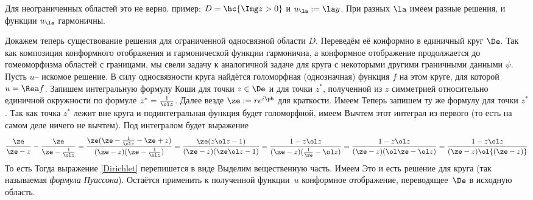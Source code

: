 \documentclass[a4paper]{article}
\begin{document}
Для неограниченных областей это не верно. пример: $D = \hc{\Img  z > 0}$ и $u_\la :=\la y$. При разных
$\la$ имеем разные решения, и функции $u_\la$ гармоничны.

Докажем теперь существование решения для ограниченной односвязной области $D$.
Переведём её конформно в единичный круг $\De$. Так как композиция конформного отображения и гармонической
функции гармонична, а конформное отображение продолжается до гомеоморфизма областей с границами, мы свели
задачу к аналогичной задаче для круга с некоторыми другими граничными данными $\psi$. Пусть $u$--
искомое решение. В силу односвязности круга найдётся голоморфная (однозначная) функция $f$ на этом круге,
для которой $u=\Rea f$. Запишем интегральную формулу Коши для точки $z\in \De$ и для точки $z^*$,
полученной из $z$ симметрией относительно единичной окружности по формуле $z^* = \frac{1}{\ol z}$.
Далее везде $\ze := re^{i\ph}$ для краткости. Имеем
Теперь запишем ту же формулу для точки $z^*$. Так как точка $z^*$ лежит вне круга и подинтегральная
функция будет голоморфной, имеем
Вычтем этот интеграл из первого (то есть на самом деле ничего не вычтем). Под интегралом будет выражение
$$
  \frac{\ze}{\ze-z}-\frac{\ze}{\ze - \frac{1}{\ol z}} =
  \frac{\ze(\ze - \frac{1}{\ol z} - \ze + z)} {(\ze - z)(\ze - \frac{1}{\ol z})} =
  \frac{\ze(z \ol z - 1)}{(\ze - z)(\ze \ol z - 1)} =
  \frac{1 - z \ol z} {(\ze - z)(\frac{1}{\ze} - \ol z)} =
  \frac{1 - z \ol z} {(\ze - z)(\ol \ze - \ol z)} =
  \frac{1 - z \ol z} {(\ze - z)\ol{(\ze - z)}}
$$
То есть
Тогда выражение \eqref{Dirichlet} перепишется в виде
Выделим вещественную часть. Имеем
Это и есть решение для круга (так называемая \emph{формула Пуассона}). Остаётся применить к полученной
функции~$u$ конформное отображение, переводящее~$\De$ в исходную область.
\end{document}
